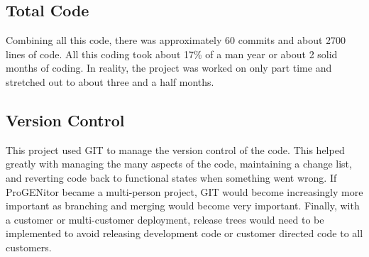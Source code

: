 \subsection{Total Code}
Combining all this code, there was approximately 60 commits and about 2700 lines
of code.  All this coding took about 17\% of a man year or about 2 solid months
of coding.  In reality, the project was worked on only part time and stretched
out to about three and a half months.
\subsection{Version Control}
This project used GIT to manage the version control of the code.  This helped
greatly with managing the many aspects of the code, maintaining a change list,
and reverting code back to functional states when something went wrong.  If
ProGENitor became a multi-person project, GIT would become increasingly more
important as branching and merging would become very important.  Finally,
with a customer or multi-customer deployment, release trees would need to be
implemented to avoid releasing development code or customer directed code to all
customers.
